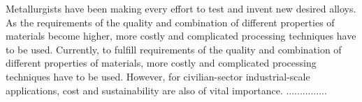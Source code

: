 Metallurgists have been making every effort to test and invent new desired alloys. As the requirements of the quality and combination of different properties of materials become higher, more costly and complicated processing techniques have to be used. Currently, to fulfill requirements of the quality and combination of different properties of materials, more costly and complicated processing techniques have to be used. However, for civilian-sector industrial-scale applications, cost and sustainability are also of vital importance.   ...............